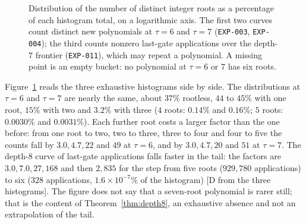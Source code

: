\documentclass[11pt]{article}
\theoremstyle{definition}
\theoremstyle{remark}
\begin{document}
\begin{figure}[t]
\centering
{}
\caption{Distribution of the number of distinct integer roots as a percentage of each histogram
total, on a logarithmic axis. The first two curves count distinct new polynomials at $\tau = 6$
and $\tau = 7$ (\texttt{EXP-003}, \texttt{EXP-004}); the third counts nonzero last-gate
applications over the depth-$7$ frontier (\texttt{EXP-011}), which may repeat a polynomial.
A missing point is an empty bucket: no polynomial at $\tau = 6$ or $7$ has six roots.}
\label{fig:zhist}
\end{figure}

Figure~\ref{fig:zhist} reads the three exhaustive histograms side by side. The distributions at
$\tau = 6$ and $\tau = 7$ are nearly the same, about $37\%$ rootless, $44$ to $45\%$ with one root,
$15\%$ with two and $3.2\%$ with three ($4$ roots: $0.14\%$ and $0.16\%$; $5$ roots:
$0.0030\%$ and $0.0031\%$). Each further root costs a larger factor than the one before: from
one root to two, two to three, three to four and four to five the counts fall by $3.0, 4.7, 22$
and $49$ at $\tau = 6$, and by $3.0, 4.7, 20$ and $51$ at $\tau = 7$. The depth-$8$ curve of
last-gate applications falls faster in the tail: the factors are $3.0, 7.0, 27, 168$ and then
$2{,}835$ for the step from five roots ($929{,}780$ applications) to six ($328$
applications, $1.6 \times 10^{-7}\%$ of the histogram) [D from the three histograms]. The
figure does not say that a seven-root polynomial is rarer still; that is
the content of Theorem~\ref{thm:depth8}, an exhaustive absence and not an extrapolation of
the tail.
\end{document}

